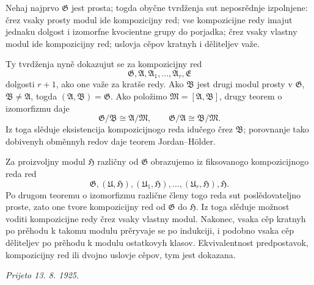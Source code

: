 \documentclass[11pt]{article}
\providecommand{\mG}{\mathfrak{G}}
\providecommand{\mU}{\mathfrak{U}}
\providecommand{\mE}{\mathfrak{E}}
\providecommand{\mA}{\mathfrak{A}}
\providecommand{\mB}{\mathfrak{B}}
\providecommand{\mM}{\mathfrak{M}}
\providecommand{\mH}{\mathfrak{H}}
\begin{document}
Nehaj najprvo $\mG$ jest prosta; togda obyčne tvrdženja sut neposrědnje izpolnjene: črez vsaky prosty modul ide kompozicijny red; vse kompozicijne redy imajut jednaku dolgost i izomorfne kvocientne grupy do porjadka; črez vsaky vlastny modul ide kompozicijny red; uslovja cěpov kratnyh i děliteljev važe.

Ty tvrdženja nyně dokazujut se za kompozicijny red
\[
        \mG,\mA,\mA_1,\ldots,\mA_r,\mE
\]
dolgosti $r+1$, ako one važe za kratše redy. Ako $\mB$ jest drugi modul prosty v $\mG$, $\mB\ne\mA$, togda $(\mA,\mB)=\mG$. Ako položimo $\mM=[\mA,\mB]$, drugy teorem o izomorfizmu daje
\[
        \mG/\mB\cong\mA/\mM,
        \qquad
        \mG/\mA\cong\mB/\mM.
\]
Iz toga slěduje eksistencija kompozicijnogo reda idučego črez $\mB$; porovnanje tako dobivenyh obměnnyh redov daje teorem Jordan--Hölder.

Za proizvoljny modul $\mH$ različny od $\mG$ obrazujemo iz fiksovanogo kompozicijnogo reda red
\[
        \mG,(\mU,\mH),(\mU_1,\mH),\ldots,(\mU_r,\mH),\mH.
\]
Po drugom teoremu o izomorfizmu različne členy togo reda sut poslědovateljno proste, zato one tvore kompozicijny red od $\mG$ do $\mH$. Iz toga slěduje možnost voditi kompozicijne redy črez vsaky vlastny modul. Nakonec, vsaka cěp kratnyh po prěhodu k takomu modulu prěryvaje se po indukciji, i podobno vsaka cěp děliteljev po prěhodu k modulu ostatkovyh klasov. Ekvivalentnost predpostavok, kompozicijny red ili dvojno uslovje cěpov, tym jest dokazana.

\emph{Prijeto 13. 8. 1925.}
\end{document}
